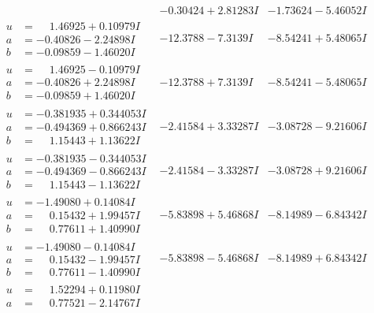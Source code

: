 \documentclass[1p]{elsarticle_modified}
\theoremstyle{definition}
\begin{document}
$$\begin{array}{c|c|c}
 & -0.30424 + 2.81283 I & -1.73624 - 5.46052 I \\ \hline\begin{aligned}
u &= \phantom{-}1.46925 + 0.10979 I \\
a &= -0.40826 - 2.24898 I \\
b &= -0.09859 - 1.46020 I\end{aligned}
 & -12.3788 - 7.3139 I & -8.54241 + 5.48065 I \\ \hline\begin{aligned}
u &= \phantom{-}1.46925 - 0.10979 I \\
a &= -0.40826 + 2.24898 I \\
b &= -0.09859 + 1.46020 I\end{aligned}
 & -12.3788 + 7.3139 I & -8.54241 - 5.48065 I \\ \hline\begin{aligned}
u &= -0.381935 + 0.344053 I \\
a &= -0.494369 + 0.866243 I \\
b &= \phantom{-}1.15443 + 1.13622 I\end{aligned}
 & -2.41584 + 3.33287 I & -3.08728 - 9.21606 I \\ \hline\begin{aligned}
u &= -0.381935 - 0.344053 I \\
a &= -0.494369 - 0.866243 I \\
b &= \phantom{-}1.15443 - 1.13622 I\end{aligned}
 & -2.41584 - 3.33287 I & -3.08728 + 9.21606 I \\ \hline\begin{aligned}
u &= -1.49080 + 0.14084 I \\
a &= \phantom{-}0.15432 + 1.99457 I \\
b &= \phantom{-}0.77611 + 1.40990 I\end{aligned}
 & -5.83898 + 5.46868 I & -8.14989 - 6.84342 I \\ \hline\begin{aligned}
u &= -1.49080 - 0.14084 I \\
a &= \phantom{-}0.15432 - 1.99457 I \\
b &= \phantom{-}0.77611 - 1.40990 I\end{aligned}
 & -5.83898 - 5.46868 I & -8.14989 + 6.84342 I \\ \hline\begin{aligned}
u &= \phantom{-}1.52294 + 0.11980 I \\
a &= \phantom{-}0.77521 - 2.14767 I \\

\end{aligned}
\end{array}$$
\end{document}

